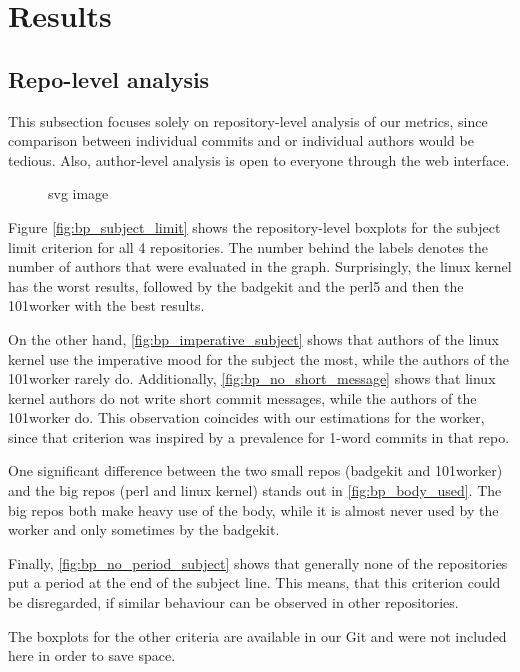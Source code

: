 \section{Results}
\label{sec:results}



\subsection{Repo-level analysis}
\label{sec:results1}
This subsection focuses solely on repository-level analysis of our metrics, since comparison between individual commits and or individual authors would be tedious. Also, author-level analysis is open to everyone through the web interface.


\begin{figure}[htbp]
  \centering
  
  \caption{svg image}
\end{figure}

Figure \ref{fig:bp_subject_limit} shows the repository-level boxplots for the subject limit criterion for all 4 repositories. The number behind the labels denotes the number of authors that were evaluated in the graph. Surprisingly, the linux kernel has the worst results, followed by the badgekit and the perl5 and then the 101worker with the best results.

On the other hand, \ref{fig:bp_imperative_subject} shows that authors of the linux kernel use the imperative mood for the subject the most, while the authors of the 101worker rarely do. Additionally, \ref{fig:bp_no_short_message} shows that linux kernel authors do not write short commit messages, while the authors of the 101worker do. This observation coincides with our estimations for the worker, since that criterion was inspired by a prevalence for 1-word commits in that repo.

One significant difference between the two small repos (badgekit and 101worker) and the big repos (perl and linux kernel) stands out in \ref{fig:bp_body_used}. The big repos both make heavy use of the body, while it is almost never used by the worker and only sometimes by the badgekit.

Finally, \ref{fig:bp_no_period_subject} shows that generally none of the repositories put a period at the end of the subject line. This means, that this criterion could be disregarded, if similar behaviour can be observed in other repositories.

The boxplots for the other criteria are available in our Git and were not included here in order to save space.

